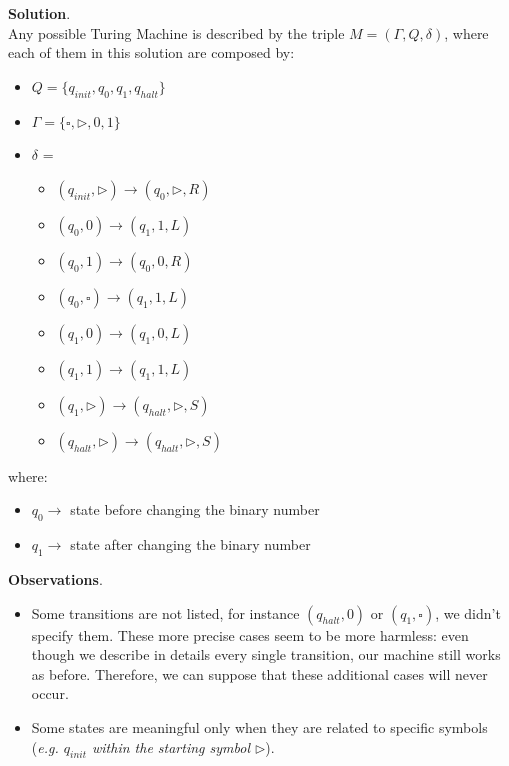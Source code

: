 \begin{example}[title = $inc(x)$ function]
    \textbf{Solution}. \\
    Any possible Turing Machine is described by the triple $M = (\Gamma, Q, \delta)$, where each of them in this solution are composed by:
    \begin{itemize}
        \renewcommand{\labelitemi}{-}
        \item $Q = \{q_{init}, q_0, q_1, q_{halt}\}$
        \item $\Gamma = \{\square, \triangleright, 0, 1\}$
        \item $\delta$ = 
            \begin{itemize}
                \renewcommand{\labelitemi}{}
                \item $(q_{init}, \triangleright) \rightarrow (q_0, \triangleright, R)$
                \item $(q_{0}, 0) \rightarrow (q_1, 1, L)$
                \item $(q_{0}, 1) \rightarrow (q_0, 0, R)$
                \item $(q_{0}, \square) \rightarrow (q_1, 1, L)$
                \item $(q_{1}, 0) \rightarrow (q_1, 0, L)$
                \item $(q_{1}, 1) \rightarrow (q_1, 1, L)$
                \item $(q_{1}, \triangleright) \rightarrow (q_{halt}, \triangleright, S)$
                \item $(q_{halt}, \triangleright) \rightarrow (q_{halt}, \triangleright, S)$
            \end{itemize}
    \end{itemize}
    where:
    \begin{itemize}
        \renewcommand{\labelitemi}{-}
        \item $q_0 \rightarrow$ state before changing the binary number
        \item $q_1 \rightarrow$ state after changing the binary number
    \end{itemize} \vspace{14pt}

    \textbf{Observations}.
    \begin{itemize}
        \renewcommand{\labelitemi}{-}
        \item Some transitions are not listed, for instance $(q_{halt}, 0)$ or $(q_1, \square)$, we didn't specify them. These more precise cases seem to be more harmless: even though we describe in details every single transition, our machine still works as before. Therefore, we can suppose that these additional cases will never occur.
        \item Some states are meaningful only when they are related to specific symbols (\textit{e.g. $q_{init}$ within the starting symbol $\triangleright$}).
    \end{itemize}
\end{example}